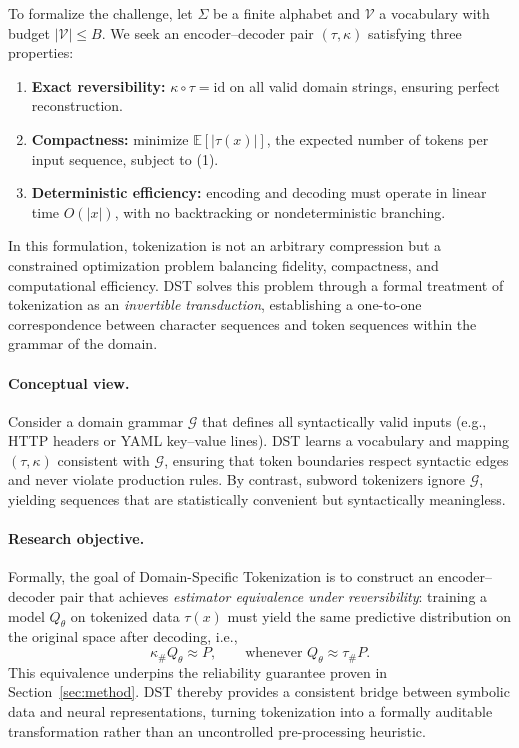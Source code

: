 To formalize the challenge, let $\Sigma$ be a finite alphabet and $\mathcal{V}$ a vocabulary with budget $|\mathcal{V}|\le B$.
We seek an encoder–decoder pair $(\tau, \kappa)$ satisfying three properties:

\begin{enumerate}
    \item \textbf{Exact reversibility:} $\kappa\circ\tau = \mathrm{id}$ on all valid domain strings, ensuring perfect reconstruction.
    \item \textbf{Compactness:} minimize $\mathbb{E}[|\tau(x)|]$, the expected number of tokens per input sequence, subject to (1).
    \item \textbf{Deterministic efficiency:} encoding and decoding must operate in linear time $O(|x|)$, with no backtracking or nondeterministic branching.
\end{enumerate}

In this formulation, tokenization is not an arbitrary compression but a constrained optimization problem balancing fidelity, compactness, and computational efficiency.
DST solves this problem through a formal treatment of tokenization as an \emph{invertible transduction}, establishing a one-to-one correspondence between character sequences and token sequences within the grammar of the domain.

\paragraph{Conceptual view.}
Consider a domain grammar $\mathcal{G}$ that defines all syntactically valid inputs (e.g., HTTP headers or YAML key–value lines).
DST learns a vocabulary and mapping $(\tau, \kappa)$ consistent with $\mathcal{G}$, ensuring that token boundaries respect syntactic edges and never violate production rules.
By contrast, subword tokenizers ignore $\mathcal{G}$, yielding sequences that are statistically convenient but syntactically meaningless.

\paragraph{Research objective.}
Formally, the goal of Domain-Specific Tokenization is to construct an encoder–decoder pair that achieves \emph{estimator equivalence under reversibility}:
training a model $Q_\theta$ on tokenized data $\tau(x)$ must yield the same predictive distribution on the original space after decoding, i.e.,
\[
\kappa_{\#}Q_\theta \approx P, \qquad \text{whenever } Q_\theta \approx \tau_{\#}P.
\]
This equivalence underpins the reliability guarantee proven in Section~\ref{sec:method}.
DST thereby provides a consistent bridge between symbolic data and neural representations, turning tokenization into a formally auditable transformation rather than an uncontrolled pre-processing heuristic.